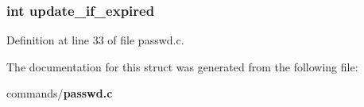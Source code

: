 \subsubsection[{update\_\-if\_\-expired}]{\setlength{\rightskip}{0pt plus 5cm}int {\bf update\_\-if\_\-expired}}\label{structpasswd__options__t_af47876856b78409d608c6e6a886c352c}


Definition at line 33 of file passwd.c.



The documentation for this struct was generated from the following file:\begin{DoxyCompactItemize}
\item 
commands/{\bf passwd.c}\end{DoxyCompactItemize}
